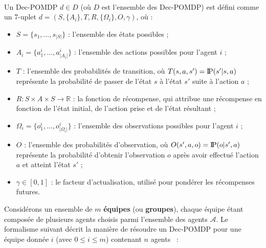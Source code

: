 \documentclass[sigconf,anonymous]{aamas}
\newcommand{\probP}{\text{I\kern-0.15em P}}
\begin{document}
\

Un Dec-POMDP $d \in D$ (où $D$ est l'ensemble des Dec-POMDP) est défini comme un 7-uplet $d = (S, \{A_i\}, T, R, \{\Omega_i\}, O, \gamma)$, où :

\begin{itemize}
    \item $S = \{s_1,...,s_{|S|}\}$ : l'ensemble des états possibles ;
    \item $A_{i} = \{a_{1}^{i},...,a_{|A_{i}|}^{i}\}$ : l'ensemble des actions possibles pour l'agent $i$ ;
    \item $T$ : l'ensemble des probabilités de transition, où $T(s,a,s') = \probP(s'|s,a)$ représente la probabilité de passer de l'état $s$ à l'état $s'$ suite à l'action $a$ ;
    \item $R: S \times A \times S \rightarrow \mathbb{R}$ : la fonction de récompense, qui attribue une récompense en fonction de l'état initial, de l'action prise et de l'état résultant ;
    \item $\Omega_{i} = \{o_{1}^{i},...,o_{|\Omega_{i}|}^{i}\}$ : l'ensemble des observations possibles pour l'agent $i$ ;
    \item $O$ : l'ensemble des probabilités d'observation, où $O(s',a,o) = \probP(o|s',a)$ représente la probabilité d'obtenir l'observation $o$ après avoir effectué l'action $a$ et atteint l'état $s'$ ;
    \item $\gamma \in [0,1]$ : le facteur d'actualisation, utilisé pour pondérer les récompenses futures.
\end{itemize}

Considérons un ensemble de $m$ \textbf{équipes} (ou \textbf{groupes}), chaque équipe étant composée de plusieurs agents choisis parmi l'ensemble des agents $\mathcal{A}$. Le formalisme suivant décrit la manière de résoudre un Dec-POMDP pour une équipe donnée $i$ (avec $0 \leq i \leq m$) contenant $n$ agents~\citep{Beynier2013,Albrecht2024} :
\end{document}
